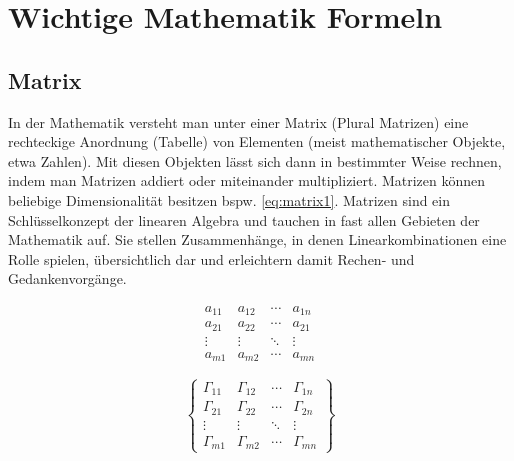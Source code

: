 \chapter{Wichtige Mathematik Formeln}
\label{cha:wichtige_mathematik_formeln}


\section{Matrix}
\label{sec:matrix}
In der Mathematik versteht man unter einer Matrix (Plural Matrizen) eine rechteckige Anordnung (Tabelle) von Elementen (meist mathematischer Objekte, etwa Zahlen). Mit diesen Objekten lässt sich dann in bestimmter Weise rechnen, indem man Matrizen addiert oder miteinander multipliziert. Matrizen können beliebige Dimensionalität besitzen bspw. \ref{eq:matrix1}.
\vspace{5mm}
Matrizen sind ein Schlüsselkonzept der linearen Algebra und tauchen in fast allen Gebieten der Mathematik auf. Sie stellen Zusammenhänge, in denen Linearkombinationen eine Rolle spielen, übersichtlich dar und erleichtern damit Rechen- und Gedankenvorgänge.
\vspace{5mm}

\[ \begin{array}{|cccc|} \label{eq:matrix1}
a_{11} & a_{12} & \cdots & a_{1n} \\
a_{21} & a_{22} & \cdots & a_{21} \\
\vdots & \vdots & \ddots & \vdots \\
a_{m1} & a_{m2} & \cdots & a_{mn}
\end{array} \]

\begin{displaymath}
\left\{\begin{array}{cccc}
\Gamma_{11} & \Gamma_{12} & \cdots &
\Gamma_{1n}\\
\Gamma_{21} & \Gamma_{22} & \cdots &
\Gamma_{2n}\\
\vdots & \vdots & \ddots &
\vdots\\
\Gamma_{m1} & \Gamma_{m2} & \cdots &
\Gamma_{mn}
\end{array}\right\}
\end{displaymath}


